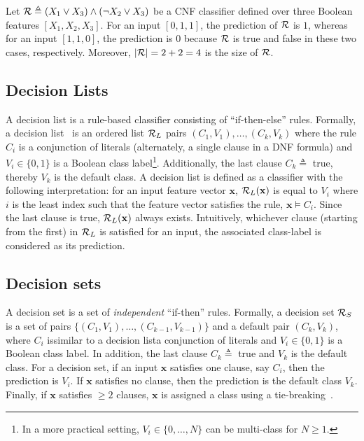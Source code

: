 \begin{example}
	\normalfont
	Let $ {\mathcal{R}} \triangleq (X_1 \vee X_3) \wedge (\neg X_2 \vee X_3) $ be a CNF classifier defined over three Boolean features $ [X_1, X_2, X_3] $. For an input $ [0, 1, 1] $, the prediction of $ {\mathcal{R}}  $ is $ 1 $, whereas for an input $ [1, 1, 0] $, the prediction is $ 0 $ because $ {\mathcal{R}} $ is true and false in these two cases, respectively. Moreover, $ |{\mathcal{R}}| = 2 + 2 = 4 $ is the size of $ {\mathcal{R}} $. 
\end{example}

\subsection{Decision Lists} A decision list is a rule-based classifier consisting of ``if-then-else'' rules. Formally, a decision list~\cite{rivest1987learning} is an ordered list $ {\mathcal{R}}_L $ pairs $ (C_1, V_1), \dots, (C_k, V_k) $ where the  rule $ C_i $ is a conjunction of literals (alternately, a single clause in a DNF formula) and $ V_i \in \{0,1\} $ is  a Boolean class label\footnote{In a more practical setting, $ V_i \in \{0, \dots, N\} $  can be multi-class for $ N \ge 1 $.}. Additionally, the last clause $ C_k \triangleq  $ true, thereby $ V_k $ is the default class. A decision list is defined as a classifier with the following interpretation: for an input feature vector $ \mathbf{x} $,  $ {\mathcal{R}}_L(\mathbf{x}) $ is equal to $ V_i $ where $ i $ is the least index such that the feature vector satisfies the rule, $ \mathbf{x} \models C_i $. Since the last clause is true, $ {\mathcal{R}}_L(\mathbf{x}) $ always exists. Intuitively, whichever clause (starting from the first) in $ {\mathcal{R}}_L $ is satisfied for an input, the associated class-label is considered as its prediction.

\subsection{Decision sets} A decision set is a set of \textit{independent} ``if-then'' rules. Formally,  a decision set $ {\mathcal{R}}_S $ is a set of pairs $ \{(C_1, V_1), \dots, (C_{k-1}, V_{k-1})\}  $ and a  default pair $ (C_k, V_k) $, where $ C_i $ is\textemdash similar to a decision list\textemdash a conjunction of literals and $ V_i \in \{0,1\} $ is a Boolean class label. In addition, the last clause $ C_k \triangleq  $ true and $ V_k $ is the default class. For a  decision set, if an input $ \mathbf{x} $ satisfies one clause, say $ C_i $, then the prediction is $ V_i $. If $ \mathbf{x} $ satisfies no clause, then the prediction is the default class $ V_k $. Finally, if $ \mathbf{x} $ satisfies  $ \ge 2 $ clauses, $ \mathbf{x} $ is assigned a class using a tie-breaking~\cite{lakkaraju2016interpretable}. 



